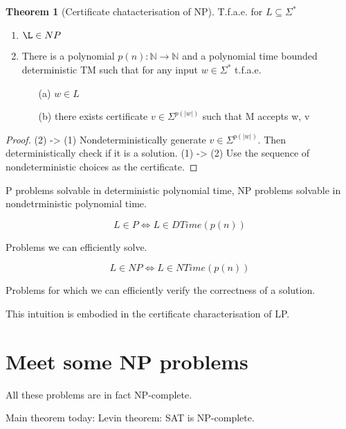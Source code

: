 \documentclass[a4paper,12pt]{article}
\theoremstyle{definition}
\newtheorem{theorem}[counter]{Theorem}
\theoremstyle{remark}
\newcommand{\N}{\mathbb{N}}
\begin{document}
\begin{theorem}[Certificate chatacterisation of NP]
    T.f.a.e. for $L \subseteq \Sigma^*$
    \begin{enumerate}
        \item $\L \in NP$
        \item There is a polynomial $p(n): \N \to \N$ and a polynomial time bounded deterministic TM such that for any input $w \in \Sigma^*$ t.f.a.e.
        \begin{itemize}
            \item[(a)] $w \in L$
            \item[(b)] there exists certificate $v \in \Sigma^{p(|w|)}$ such that M accepts w, v
        \end{itemize}
    \end{enumerate}

\end{theorem}

\begin{proof}
    (2) -> (1) Nondeterministically generate $v \in \Sigma^{p(|w|)}$. Then deterministically check if it is a solution.
    (1) -> (2) Use the sequence of nondeterministic choices as the certificate.
\end{proof}






\newpage
P problems solvable in deterministic polynomial time, NP problems solvable in nondetrministic polynomial time.

\begin{equation*}
    L \in P \iff L \in DTime(p(n))
\end{equation*}

Problems we can efficiently solve.

\begin{equation*}
    L \in NP \iff L \in NTime(p(n))
\end{equation*}


Problems for which we can efficiently verify the correctness of a solution.

This intuition is embodied in the certificate characterisation of LP.

\section{Meet some NP problems}
All these problems are in fact NP-complete.

Main theorem today: Levin theorem: SAT is NP-complete.
\end{document}
